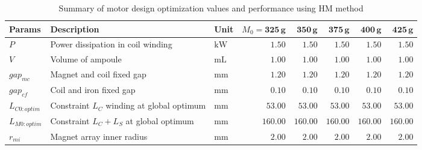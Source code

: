             
            \begin{landscape}
                \begin{table}
                    \renewcommand{\arraystretch}{1.2}
                    \caption{Summary of motor design optimization values and performance using \acs {HM} method}
                    \label{table:result for global optimization of PMLSM via HM method}
                    \centering
                    \begin{tabular}{lllrrrrr}
                        \hline
                        \textbf{Params}     & \textbf{Description}                            & \textbf{Unit}           & $M_0=\mathbf{325\,g}$ & $\mathbf{350\,g}$ & $\mathbf{375\,g}$ & $\mathbf{400\,g}$ & $\mathbf{425\,g}$ \\
                        \hline
                        $P$        & Power dissipation in coil winding      & $\mathrm{kW}$  & $1.50$                & $1.50$            & $1.50$            & $1.50$            & $1.50$            \\
                        $V$        & Volume of ampoule                      & $\mathrm{mL}$  & $1.00$                & $1.00$            & $1.00$            & $1.00$            & $1.00$            \\
                        $gap_{mc}$ & Magnet and coil fixed gap              & $\mathrm{mm}$  & $1.20$                & $1.20$            & $1.20$            & $1.20$            & $1.20$            \\
                        $gap_{cf}$ & Coil and iron fixed gap                & $\mathrm{mm}$  & $0.10$                & $0.10$            & $0.10$            & $0.10$            & $0.10$            \\
                        \hline
                        $L_{C0:optim}$ & Constraint $L_C$ winding at global optimum & $\mathrm{mm}$        & $53.00$                       & $53.00$           & $53.00$           & $53.00$           & $53.00$           \\
                        $L_{M0:optim}$ & Constraint $L_C+L_S$ at global optimum        & $\mathrm{mm}$        & $160.00$                      & $160.00$          & $160.00$          & $160.00$          & $160.00$          \\
                        \hline
                        $r_{mi}$   & Magnet array inner radius              & $\mathrm{mm}$  & $2.00$                & $2.00$            & $2.00$            & $2.00$            & $2.00$            \\

\end{tabular}
\end{table}
\end{landscape}
